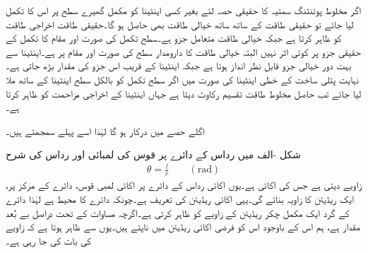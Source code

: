 اگر مخلوط پوئنٹنگ سمتیہ کا حقیقی حصہ لئے بغیر کسی اینٹینا کو مکمل گھیرے سطح پر اس کا تکمل لیا جائے تو حقیقی طاقت کے ساتھ ساتھ خیالی طاقت بھی حاصل ہو گا۔حقیقی طاقت اخراجی طاقت کو ظاہر کرتا ہے جبکہ خیالی طاقت  متعامل جزو ہے۔سطح تکمل کی صورت اور مقام کا تکمل کے حقیقی جزو پر کوئی اثر نہیں البتہ خیالی طاقت کا دارومدار سطح کی صورت اور مقام پر ہے۔اینٹینا سے بہت دور خیالی جزو قابل نظر انداز ہوتا ہے جبکہ اینٹینا کے قریب اس جزو کی مقدار بڑھ جاتی ہے۔نہایت پتلی ساخت کے خطی اینٹینا کی صورت میں اگر سطح تکمل کو بالکل سطح اینٹینا کے ساتھ ملا لیا جائے تب حاصل مخلوط طاقت تقسیم  رکاوٹ  دیتا ہے جہاں  اینٹینا کے اخراجی مزاحمت کو ظاہر کرتا ہے۔

اگلے حصے میں  درکار ہو گا لہٰذا اسے پہلے سمجھتے ہیں۔

شکل -الف میں رداس  کے دائرے پر قوس کی لمبائی  اور  رداس  کی شرح
\begin{align}\label{مساوات_اینٹینا_ریڈیئن_تعریف}
\theta=\frac{l}{r} \quad \quad (\si{\radian})
\end{align}
 زاویے  دیتی ہے جس کی اکائی   ہے۔یوں اکائی رداس کے دائرے پر اکائی لمبی قوس، دائرے کے مرکز پر، ایک ریڈیئن  کا زاویہ بنائے گی۔یہی اکائی ریڈیئن کی تعریف ہے۔چونکہ دائرے کا محیط  ہے لہٰذا دائرے کے گرد ایک مکمل چکر  ریڈیئن  کے زاویے کو ظاہر کرتی ہے۔اگرچہ مساوات  کے تحت  دراصل بے بُعد مقدار ہے، ہم اس کے باوجود اس کو فرضی اکائی ریڈیئن میں ناپتے ہیں۔یوں  سے ظاہر ہوتا ہے کہ  زاویے کی بات کی جا رہی ہے۔

